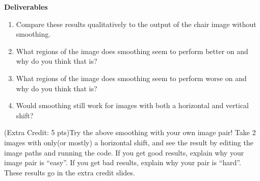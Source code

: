 \documentclass[
  letterpaper,
  DIV=11,
  numbers=noendperiod]{scrartcl}
\providecommand{\tightlist}{%
  \setlength{\itemsep}{0pt}\setlength{\parskip}{0pt}}\usepackage{longtable,booktabs,array}
\begin{document}
\textbf{Deliverables}

\begin{enumerate}
\def\labelenumi{\arabic{enumi}.}
\tightlist
\item
  Compare these results qualitatively to the output of the chair image
  without smoothing.
\item
  What regions of the image does smoothing seem to perform better on and
  why do you think that is?
\item
  What regions of the image does smoothing seem to perform worse on and
  why do you think that is?
\item
  Would smoothing still work for images with both a horizontal and
  vertical shift?
\end{enumerate}

(Extra Credit: 5 pts)Try the above smoothing with your own image pair!
Take 2 images with only(or mostly) a horizontal shift, and see the
result by editing the image paths and running the code. If you get good
results, explain why your image pair is ``easy''. If you get bad
results, explain why your pair is ``hard''. These results go in the
extra credit slides.
\end{document}
